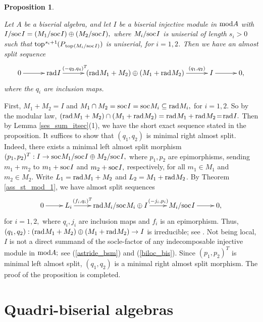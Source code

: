 \documentclass[10pt]{amsart}
\newtheorem{Prop}[Theo]{Proposition}
\theoremstyle{definition}
\newcommand{\mmod}{{\rm mod}}
\newcommand{\rad}{{\rm rad}\hspace{.5pt}}
\newcommand{\soc}{{\rm soc}\hspace{.5pt}}
\newcommand{\ntop}{{\rm top}\hspace{.5pt}}
\newcommand{\hp}{\hspace{.5pt}}
\newcommand{\vp}{\vspace{.5pt}}
\begin{document}
\begin{Prop}\label{ass_endi}

Let $A$ be a biserial algebra, and let $I$ be a biserial injective module in $\mmod A$ with $I/\soc I=(M_1/\soc I) \oplus (M_2/\soc I),$ where $M_i/\soc I$ is uniserial of length $s_i>0$ such that $\ntop^{s_i+1}\hspace{-.5pt}(P_{\hp\hp \ntop(M_i/\soc I)})$ is uniserial, for $i=1, 2$. Then we have an almost split sequence \vspace{-5.5pt}
$$\xymatrixcolsep{30pt}\xymatrix{0\ar[r] & \rad I \ar[r]^-{(-q_3, q_4)^T\hspace{-4pt}}& (\rad M_1 + M_2) \oplus (M_1+\rad M_2) \ar[r]^-{(q_1, q_2)} &  I \ar[r] & 0,} \vspace{-3.5pt} $$ where the $q_i$ are inclusion maps.

\end{Prop}

 First, $M_1+M_2=I$ and $M_1\cap M_2=\soc I=\soc M_i\subseteq \rad M_i,$ for $i=1, 2$. So by the modular law, 
$(\rad M_1 + M_2) \cap (M_1+\rad M_2)=\rad M_1+\rad M_2\!=\!\rad I.$ Then by Lemma \ref{ses_sum_itsec}(1), we have the short exact sequence stated in the proposition. It suffices to show that $(q_1, q_2)$ is minimal right almost split.\vspace{1pt} Indeed, there exists a minimal left almost split morphism $(p_1, p_2)^T: I\to \soc M_1/\soc I \oplus M_2/\soc I,$ where $p_1, p_2$ are epimorphisms, sending $m_1+m_2$ to $m_1+\soc I$ and $m_2+\soc I,$ respectively, for all $m_1\in M_1$ and $m_2\in M_2$. Write $L_1=\rad M_1+M_2$ and $L_2=M_1+\rad M_2$. By Theorem \ref{ass_st_mod_1}, we have almost split sequences \vspace{-4.5pt}
$$\xymatrix{0\ar[r] & L_i \ar[r]^-{(f_i, q_i)^T} & \rad M_i / \soc M_i  \oplus I \ar[r]^-{(-j_i, p_i)} &  M_i / \soc I\ar[r] & 0,} \vspace{-4pt} $$  for $i=1, 2,$ where $q_i, j_i$ are inclusion maps and $f_i$ is an epimorphism. \vp Thus, $(q_1, q_2): (\rad M_1 + M_2) \oplus (M_1+\rad M_2)\to I$ is irreducible; see \cite[(1.3)]{LiY}. Not being local, $I$ is not a direct summand of the socle-factor of any indecomposable injective module in $\mmod A;$ see (\ref{astride_bsm}) and (\ref{biloc_bis}). Since $(p_1, p_2)^T$ is minimal left almost split, $(q_1, q_2)$ is a minimal right almost split morphism. The proof of the proposition is completed.

\section{\sc Quadri-biserial algebras} 
\end{document}
